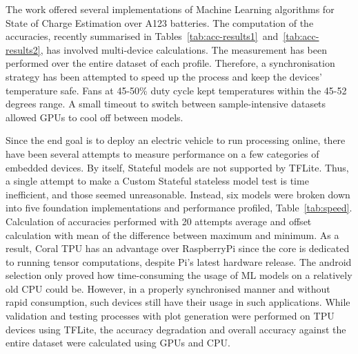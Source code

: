 The work offered several implementations of Machine Learning algorithms for State of Charge Estimation over A123 batteries.
The computation of the accuracies, recently summarised in \mbox{Tables~\ref{tab:acc-results1} and~\ref{tab:acc-results2}}, has involved multi-device calculations.
The measurement has been performed over the entire dataset of each profile.
Therefore, a synchronisation strategy has been attempted to speed up the process and keep the devices' temperature safe.
Fans at 45-50\% duty cycle kept temperatures within the 45-52 degrees range.
A small timeout to switch between sample-intensive datasets allowed GPUs to cool off between models.

%
%
Since the end goal is to deploy an electric vehicle to run processing online, there have been several attempts to measure performance on a few categories of embedded devices.
By itself, Stateful models are not supported by TFLite.
Thus, a single attempt to make a Custom Stateful stateless model test is time inefficient, and those seemed unreasonable.
Instead, six models were broken down into five foundation implementations and performance profiled, \mbox{Table~\ref{tab:speed}}.
Calculation of accuracies performed with 20 attempts average and offset calculation with mean of the difference between maximum and minimum.
As a result, Coral TPU has an advantage over RaspberryPi since the core is dedicated to running tensor computations, despite Pi's latest hardware release.
The android selection only proved how time-consuming the usage of ML models on a relatively old CPU could be.
However, in a properly synchronised manner and without rapid consumption, such devices still have their usage in such applications.
While validation and testing processes with plot generation were performed on TPU devices using TFLite, the accuracy degradation and overall accuracy against the entire dataset were calculated using GPUs and CPU.
